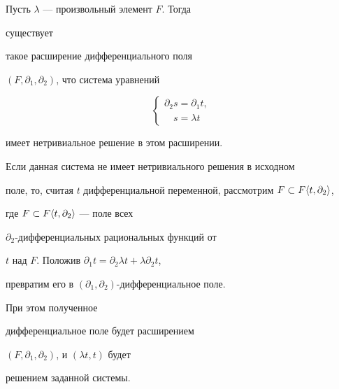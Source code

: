 \begin{prop} Пусть $\lambda$ --- произвольный элемент $F$. Тогда 


существует  


такое расширение дифференциального поля 


$(F,\partial_1,\partial_2)$, что система уравнений 


$$


\begin{cases} 


\partial_2s=\partial_1t,\\ 


\phantom{\partial_2}s=\lambda t 


\end{cases} 


$$


имеет нетривиальное решение в этом расширении. 


\end{prop} 


 


\begin{pf} 


Если данная система не имеет нетривиального решения в исходном 


поле, то, считая $t$ дифференциальной переменной, рассмотрим $F\subset 


F\la t,\partial_2 \ra$, 


где $F\subset F\langle t,\partial_2 \rangle$ --- поле всех 


$\partial_2$-дифференциальных рациональных функций от 


$t$ над $F$. Положив $\partial_1t=\partial_2\lambda 


t+\lambda\partial_2t$, 


превратим его в $(\partial_1,\partial_2)$-дифференциальное поле. 


При этом полученное 


дифференциальное поле будет расширением 


$(F,\partial_1,\partial_2)$, и $(\lambda t,t)$ будет  


решением заданной системы. 


\end{pf} 


 


